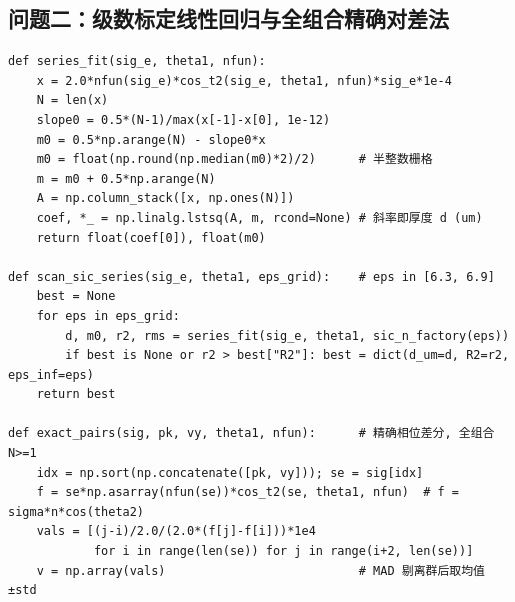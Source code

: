 \documentclass[11pt,a4paper,fontset=fandol]{ctexart}
\begin{document}
\subsection{问题二：级数标定线性回归与全组合精确对差法}
\begin{lstlisting}
def series_fit(sig_e, theta1, nfun):
    x = 2.0*nfun(sig_e)*cos_t2(sig_e, theta1, nfun)*sig_e*1e-4
    N = len(x)
    slope0 = 0.5*(N-1)/max(x[-1]-x[0], 1e-12)
    m0 = 0.5*np.arange(N) - slope0*x
    m0 = float(np.round(np.median(m0)*2)/2)      # 半整数栅格
    m = m0 + 0.5*np.arange(N)
    A = np.column_stack([x, np.ones(N)])
    coef, *_ = np.linalg.lstsq(A, m, rcond=None) # 斜率即厚度 d (um)
    return float(coef[0]), float(m0)

def scan_sic_series(sig_e, theta1, eps_grid):    # eps in [6.3, 6.9]
    best = None
    for eps in eps_grid:
        d, m0, r2, rms = series_fit(sig_e, theta1, sic_n_factory(eps))
        if best is None or r2 > best["R2"]: best = dict(d_um=d, R2=r2, eps_inf=eps)
    return best

def exact_pairs(sig, pk, vy, theta1, nfun):      # 精确相位差分, 全组合 N>=1
    idx = np.sort(np.concatenate([pk, vy])); se = sig[idx]
    f = se*np.asarray(nfun(se))*cos_t2(se, theta1, nfun)  # f = sigma*n*cos(theta2)
    vals = [(j-i)/2.0/(2.0*(f[j]-f[i]))*1e4
            for i in range(len(se)) for j in range(i+2, len(se))]
    v = np.array(vals)                           # MAD 剔离群后取均值±std
\end{lstlisting}
\end{document}
